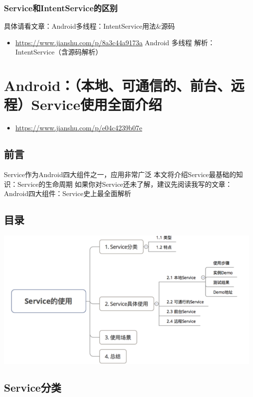 \documentclass[9pt, b5paper]{article}
\begin{document}
\subsubsection{Service和IntentService的区别}
\label{sec-2-7-2}
具体请看文章：Android多线程：IntentService用法\&源码
\begin{itemize}
\item \url{https://www.jianshu.com/p/8a3c44a9173a} Android 多线程 解析：IntentService（含源码解析）
\end{itemize}

\section{Android：（本地、可通信的、前台、远程）Service使用全面介绍}
\label{sec-3}
\begin{itemize}
\item \url{https://www.jianshu.com/p/e04c4239b07e}
\end{itemize}
\subsection{前言}
\label{sec-3-1}
Service作为Android四大组件之一，应用非常广泛
本文将介绍Service最基础的知识：Service的生命周期
如果你对Service还未了解，建议先阅读我写的文章：
Android四大组件：Service史上最全面解析
\subsection{目录}
\label{sec-3-2}

\includegraphics[width=.9\linewidth]{./pic/service2.png}
\subsection{Service分类}
\label{sec-3-3}
\end{document}

